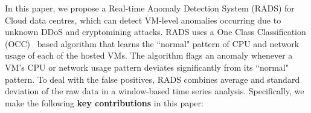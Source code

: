 In this paper, we propose a Real-time Anomaly Detection System (RADS) for Cloud data centres, which can detect VM-level anomalies occurring due to unknown DDoS and cryptomining attacks. 
RADS uses a One Class Classification (OCC)~\cite{OCC:2008} based algorithm that learns the ``normal" pattern of CPU and network usage of each of the hosted VMs. 
The algorithm flags an anomaly whenever a VM's CPU or network usage pattern deviates significantly from its ``normal" pattern. 
To deal with the false positives, RADS combines average and standard deviation of the raw data in a window-based time series analysis.
Specifically, we make the following \textbf{key contributions} in this paper:

